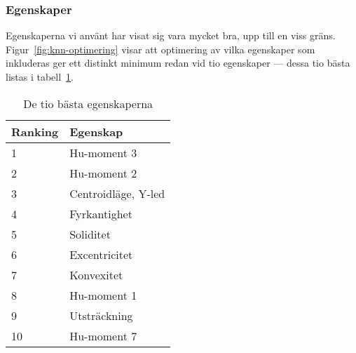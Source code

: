 \documentclass[../rapport_MVEX01-11-05]{subfiles}
\begin{document}
\subsubsection{Egenskaper}\label{sec:resultat_features}

Egenskaperna vi använt har visat sig vara mycket bra, upp till en viss gräns.
Figur~\ref{fig:knn-optimering} visar att optimering av vilka egenskaper som
inkluderas ger ett distinkt minimum redan vid tio egenskaper --- dessa tio
bästa listas i tabell~\ref{tab:bestfeats}.

\begin{table}[tb]
	\centering
	\caption{De tio bästa egenskaperna}
	\label{tab:bestfeats}
	\begin{tabular}{ll}
		\toprule
		Ranking & Egenskap \\
		\midrule
		1 & Hu-moment 3 \\
		2 & Hu-moment 2 \\
		3 & Centroidläge, Y-led \\
		4 & Fyrkantighet \\
		5 & Soliditet \\
		6 & Excentricitet \\
		7 & Konvexitet \\
		8 & Hu-moment 1 \\
		9 & Utsträckning \\
		10 & Hu-moment 7 \\
		\bottomrule
	\end{tabular}
\end{table}




%
\end{document}

